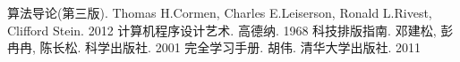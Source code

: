 \newpage
{}

\begin{thebibliography}{10}

算法导论(第三版). Thomas H.Cormen, Charles E.Leiserson, Ronald L.Rivest, Clifford Stein. 2012
计算机程序设计艺术. 高德纳. 1968
\LaTeXe 科技排版指南. 邓建松, 彭冉冉, 陈长松. 科学出版社. 2001
\LaTeXe 完全学习手册. 胡伟. 清华大学出版社. 2011

\end{thebibliography}
